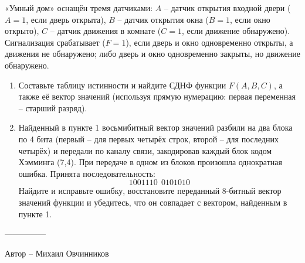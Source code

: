 \question
«Умный дом» оснащён тремя датчиками: $A$ -- датчик открытия входной двери ($A=1$, если дверь открыта), $B$ -- датчик открытия окна ($B=1$, если окно открыто), $C$ -- датчик движения в комнате ($C=1$, если движение обнаружено). Сигнализация срабатывает ($F=1$), если дверь и окно одновременно открыты, а движения не обнаружено; либо дверь и окно одновременно закрыты, но движение обнаружено.

\begin{enumerate}
\item Составьте таблицу истинности и найдите СДНФ функции $F(A,B,C)$, а также её вектор значений (используя прямую нумерацию: первая переменная -- старший разряд).
\item Найденный в пункте 1 восьмибитный вектор значений разбили на два блока по 4 бита (первый -- для первых четырёх строк, второй -- для последних четырёх) и передали по каналу связи, закодировав каждый блок кодом Хэмминга (7,4). При передаче в одном из блоков произошла однократная ошибка. Принята последовательность:
\[
1001110\ \ 0101010
\]
Найдите и исправьте ошибку, восстановите переданный 8-битный вектор значений функции и убедитесь, что он совпадает с вектором, найденным в пункте 1.
\end{enumerate}
---------------

Автор -- Михаил Овчинников 